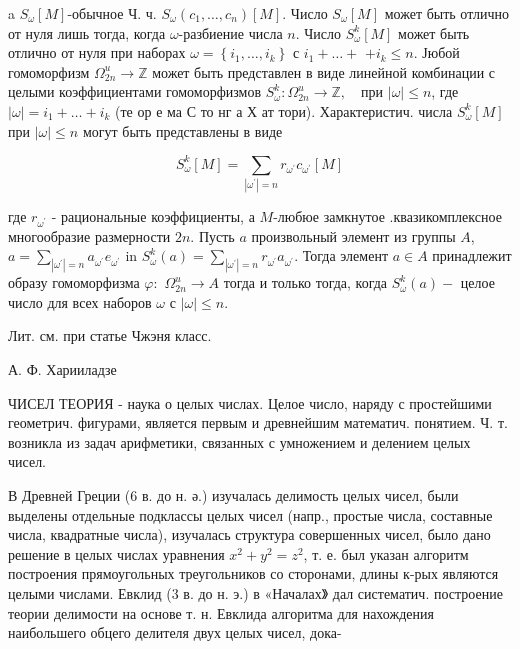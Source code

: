 \documentclass[10pt]{article}
\begin{document}
a $S_{\omega}[M]$-обычное Ч. ч. $S_{\omega}\left(c_{1}, \ldots, c_{n}\right)[M]$. Число $S_{\omega}[M]$ может быть отлично от нуля лишь тогда, когда $\omega$-разбиение числа $n$. Число $S_{\omega}^{k}[M]$ может быть отлично от нуля при наборах $\omega=\left\{i_{1}, \ldots, i_{k}\right\}$ с $i_{1}+\ldots+$ $+i_{k} \leqslant n$. Јюбой гомоморфизм $\Omega_{2 n}^{u} \rightarrow \mathbb{Z}$ может быть представлен в виде линейной комбинации с целыми коэффициентами гомоморфизмов $S_{\omega}^{k}: \Omega_{2 n}^{u} \longrightarrow \mathbb{Z}, \quad п р и$ $|\omega| \leqslant n$, где $|\omega|=i_{1}+\ldots+i_{k}$ (те ор е ма С то нг а Х ат тори). Характеристич. числа $S_{\omega}^{k}[M]$ при $|\omega| \leqslant n$ могут быть представлены в виде



\[

S_{\omega}^{k}[M]=\sum_{\left|\omega^{\prime}\right|=n} r_{\omega^{\prime}} c_{\omega^{\prime}}[M]

\]



где $r_{\omega^{\prime}}$ - рациональные коэффициенты, а $M$-любюе замкнутое .квазикомплексное многообразие размерности $2 n$. Пусть $a$ произвольный элемент из группы $A$, $a=\sum_{\left|\omega^{\prime}\right|=n} a_{\omega^{\prime}} e_{\omega^{\prime}}$ in $S_{\omega}^{k}(a)=\sum_{\left|\omega^{\prime}\right|=n} r_{\omega^{\prime}} a_{\omega^{\prime}}$. Тогда элемент $a \in A$ принадлежит образу гомоморфизма $\varphi:$ $\Omega_{2 n}^{u} \longrightarrow A$ тогда и только тогда, когда $S_{\omega}^{k}(a)-$ целое число для всех наборов $\omega$ с $|\omega| \leqslant n$.



Лит. см. при статье Чжэня класс.



А. Ф. Харииладзе



ЧИСЕЛ ТЕОРИЯ - наука о целых числах. Целое число, наряду с простейшими геометрич. фигурами, является первым и древнейшим математич. понятием. Ч. т. возникла из задач арифметики, связанных с умножением и делением целых чисел.



В Древней Греции (6 в. до н. ә.) изучалась делимость целых чисел, были выделены отдельные подклассы целых чисел (напр., простые числа, составные числа, квадратные числа), изучалась структура совершенных чисел, было дано решение в целых числах уравнения $x^{2}+y^{2}=z^{2}$, т. е. был указан алгоритм построения прямоугольных треугольников со сторонами, длины к-рых являются целыми числами. Евклид (3 в. до н. э.) в «Началах》 дал систематич. построение теории делимости на основе т. н. Евклида алгоритма для нахождения наибольшего обцего делителя двух целых чисел, дока-
\end{document}

